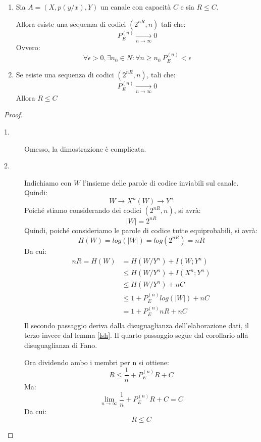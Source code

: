 \begin{teorema}
 \mbox{}

 \begin{enumerate}
  \item Sia $A=(X,p(y/x),Y)$ un canale con capacità $C$ e sia $R \le C$.

        \noindent
        Allora esiste una sequenza di codici $(2^{nR},n)$ tali che:
        \[
         P_E^{(n)} \xrightarrow[n \to \infty]{} 0
        \]
        Ovvero:
        \[
         \forall \epsilon>0, \exists n_0 \in N: \forall n \ge n_0 \ P_E^{(n)}< \epsilon
        \]
   \item Se esiste una sequenza di codici $(2^{nR},n)$, tali che:
         \[
          P_E^{(n)} \xrightarrow[n \to \infty]{} 0
         \]
         Allora $R \le C$
 \end{enumerate}
 \begin{proof}
  \mbox{}
  \begin{description}
   \item[1.] Omesso, la dimostrazione è complicata.
   \item[2.] 
    
    Indichiamo con $W$ l'insieme delle parole di codice inviabili sul canale.
    Quindi:
    \[
     W \to X^n(W) \to Y^n
    \]
    \noindent
    Poiché stiamo considerando dei codici $(2^{nR},n)$, si avrà:
    \[
     |W|=2^{nR}
    \]
    Quindi, poiché consideriamo le parole di codice tutte equiprobabili, si avrà:
    \[
     H(W)=log(|W|)=log(2^{nR})=nR
    \]
   Da cui:
   \[\begin{split}
    nR=H(W)&=H(W/Y^n)+I(W;Y^n) \\
        & \le H(W/Y^n)+I(X^n;Y^n) \\
        & \le H(W/Y^n)+nC \\
        & \le 1+P_E^{(n)} log(|W|) +nC \\
        & = 1+P_E^{(n)} nR +nC \\
     \end{split}
   \]
   Il secondo passaggio deriva dalla disuguaglianza dell'elaborazione dati, il terzo invece dal lemma \ref{lsh}.
   Il quarto passaggio segue dal corollario alla disuguaglianza di Fano.

   Ora dividendo ambo i membri per n si ottiene:
   \[
    R \le \frac{1}{n}+P_E^{(n)} R +C
   \]
   Ma:
   \[
    \lim_{n \to \infty} \frac{1}{n}+P_E^{(n)} R +C=C
   \]
   Da cui:
   \[
    R \le C
   \]

  \end{description}

 \end{proof}

\end{teorema}
